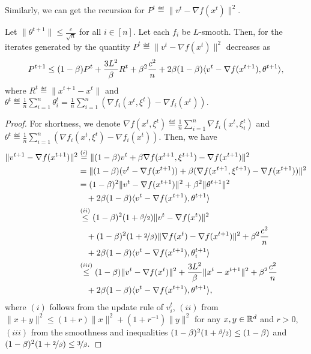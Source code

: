 \documentclass[a4paper,11pt]{article}
\begin{document}
Similarly, we can get the recursion for $P^t \eqdef \|v^t - \nabla f(x^t)\|^2$.
\begin{lemma}\label{lem:descent_Pt_dp}
    Let $\|\theta^{t+1}\|\le \frac{c}{\sqrt{n}}$ for all $i\in[n]$. Let each $f_i$ be $L$-smooth. Then, for the iterates generated by  the quantity $P^t \eqdef \|v^t - \nabla f(x^t)\|^2$ decreases as
    \[
    P^{t+1} \le (1-\beta)P^t 
    + \frac{3L^2}{\beta}R^t 
    + \beta^2\frac{c^2}{n}
    + 2\beta(1-\beta)\<v^t - \nabla f(x^{t+1}), \theta^{t+1}>,
    \]
    where $R^t \eqdef \|x^{t+1} - x^t\|$ and $\theta^t \eqdef \frac{1}{n}\sum_{i=1}^n\theta_i^t = \frac{1}{n}\sum_{i=1}^n (\nabla f_i(x^t,\xi^t) - \nabla f_i(x^t))$.
\end{lemma}
\begin{proof}
    For shortness, we denote $\nabla f(x^t,\xi^t) \eqdef \frac{1}{n}\sum_{i=1}^n \nabla f_i(x^t,\xi^t_i)$ and $\theta^t \eqdef \frac{1}{n}\sum_{i=1}^n(\nabla f_i(x^t,\xi^t) - \nabla f_i(x^t))$. Then, we have 
    \begin{align*}
        \|v^{t+1} - \nabla f(x^{t+1})\|^2
        &\overset{(i)}{=} \|(1-\beta)v^t + \beta\nabla f(x^{t+1},\xi^{t+1}) - \nabla f(x^{t+1})\|^2\\
        &= \|(1-\beta)(v^t - \nabla f(x^{t+1})) + \beta(\nabla f(x^{t+1},\xi^{t+1})- \nabla f(x^{t+1}))\|^2\\
        &= (1-\beta)^2\|v^t - \nabla f(x^{t+1})\|^2
        + \beta^2\|\theta^{t+1}\|^2\\
        & \quad + 2\beta(1-\beta)\<v^t - \nabla f(x^{t+1}), \theta^{t+1}>\\
        &\overset{(ii)}{\le} (1-\beta)^2(1+\nicefrac{\beta}{2})\|v^t - \nabla f(x^t)\|^2\\
        & \quad + (1-\beta)^2(1+\nicefrac{2}{\beta})\|\nabla f(x^t) - \nabla f(x^{t+1})\|^2
        + \beta^2\frac{c^2}{n}\\
        &\quad + 2\beta(1-\beta)\<v^t - \nabla f(x^{t+1}), \theta^{t+1}_i>\\
        &\overset{(iii)}{\le} (1-\beta)\|v^t - \nabla f(x^t)\|^2
        + \frac{3L^2}{\beta}\|x^t - x^{t+1}\|^2
        + \beta^2 \frac{c^2}{n}\\
        &\quad + 2\beta(1-\beta)\<v^t - \nabla f(x^{t+1}), \theta^{t+1}>,
    \end{align*}
    where $(i)$ follows from the update rule of $v_i^t$, $(ii)$ from $\|x+y\|^2 \le (1+r)\|x\|^2 + (1+r^{-1})\|y\|^2$ for any $x,y\in\mathbb{R}^d$ and $r > 0$, $(iii)$ from the smoothness and inequalities $(1-\beta)^2(1+\nicefrac{\beta}{2}) \le (1-\beta)$ and $(1-\beta)^2(1+\nicefrac{2}{\beta}) \le \nicefrac{3}{\beta}.$
\end{proof}
\end{document}
